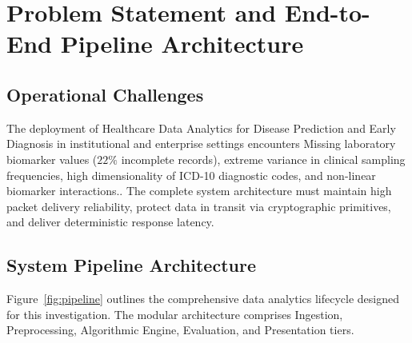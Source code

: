 \section{Problem Statement and End-to-End Pipeline Architecture}

\subsection{Operational Challenges}
The deployment of Healthcare Data Analytics for Disease Prediction and Early Diagnosis in institutional and enterprise settings encounters Missing laboratory biomarker values ($22\%$ incomplete records), extreme variance in clinical sampling frequencies, high dimensionality of ICD-10 diagnostic codes, and non-linear biomarker interactions.. The complete system architecture must maintain high packet delivery reliability, protect data in transit via cryptographic primitives, and deliver deterministic response latency.

\subsection{System Pipeline Architecture}
Figure~\ref{fig:pipeline} outlines the comprehensive data analytics lifecycle designed for this investigation. The modular architecture comprises Ingestion, Preprocessing, Algorithmic Engine, Evaluation, and Presentation tiers.

